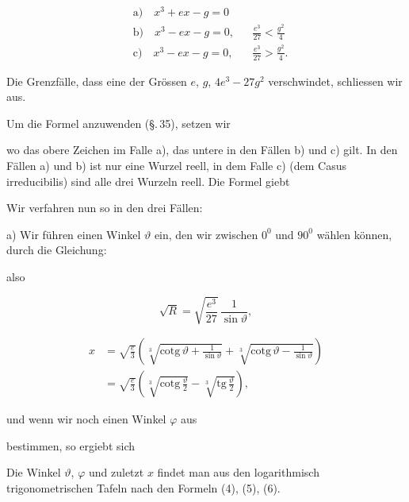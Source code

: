 
\[
\begin{aligned}
&\text{a)}\quad x^3 + e x - g = 0\\
&\text{b)}\quad x^3 - e x - g = 0, &&\frac{e^3}{27} < \frac{g^2}{4}\\
&\text{c)}\quad x^3 - e x - g = 0, &&\frac{e^3}{27} > \frac{g^2}{4}.
\end{aligned}
\]

Die Grenzfälle, dass eine der Grössen $e$, $g$, $4e^3 - 27g^2$ verschwindet, schliessen wir aus.

Um die  Formel anzuwenden (\S.\,35), setzen wir


wo das obere Zeichen im Falle a), das untere in den Fällen b) und c) gilt. In den Fällen a) und b) ist nur eine Wurzel reell, in dem Falle c) (dem Casus irreducibilis) sind alle drei Wurzeln reell. Die  Formel giebt


Wir verfahren nun so in den drei Fällen:

a) Wir führen einen Winkel $\vartheta$ ein, den wir zwischen $0^0$ und $90^0$ wählen können, durch die Gleichung:


also

\[
\sqrt{R} = \sqrt{\frac{e^3}{27}}\,\frac{1}{\sin\vartheta},
\]

\[
\begin{aligned}
x &= \sqrt{\frac{e}{3}}\left(\sqrt[3]{\mathrm{cotg}\,\vartheta + \frac{1}{\sin\vartheta}} + \sqrt[3]{\mathrm{cotg}\,\vartheta - \frac{1}{\sin\vartheta}}\right)\\
&= \sqrt{\frac{e}{3}}\left(\sqrt[3]{\mathrm{cotg}\,\frac{\vartheta}{2}} - \sqrt[3]{\mathrm{tg}\,\frac{\vartheta}{2}}\right),
\end{aligned}
\]

und wenn wir noch einen Winkel $\varphi$ aus


bestimmen, so ergiebt sich


Die Winkel $\vartheta$, $\varphi$ und zuletzt $x$ findet man aus den logarithmisch trigonometrischen Tafeln nach den Formeln (4), (5), (6).
